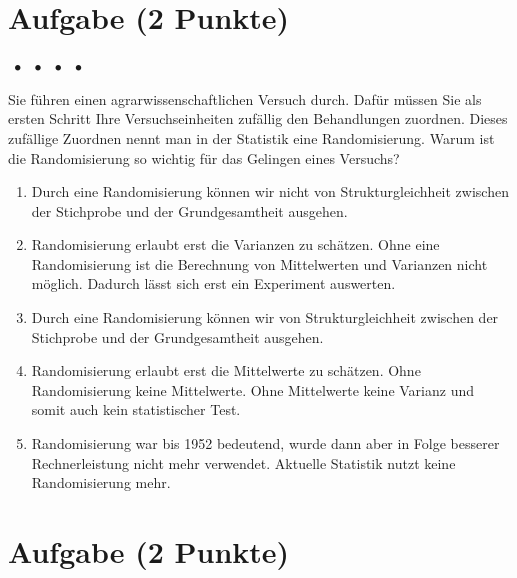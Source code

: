 \documentclass[a4paper, 9pt]{scrartcl}\usepackage[]{graphicx}\usepackage[]{xcolor}
\begin{document}
{\section{Aufgabe \hfill (2 Punkte)}

\ifcollection
\begin{flushright}
\tiny\vspace{-2Ex}
\textbf{\examinhaltstart}
\exammodulemathstat $\;\bullet$
\exammodulestat $\;\bullet$
\exammodulestatbbv $\;\bullet$
\exammodulestatversuch $\;\bullet$
\exammodulebiostat
\vspace{-1Ex}
\end{flushright}
\fi



Sie führen einen agrarwissenschaftlichen Versuch durch. Dafür müssen Sie als ersten Schritt Ihre Versuchseinheiten zufällig den Behandlungen zuordnen. Dieses zufällige Zuordnen nennt man in der Statistik eine Randomisierung. Warum ist die Randomisierung so wichtig für das Gelingen eines Versuchs?



\begin{enumerate}
\item [\textbf{A} \msquare] Durch eine Randomisierung können wir nicht von Strukturgleichheit zwischen der Stichprobe und der Grundgesamtheit ausgehen.
\item [\textbf{B} \msquare] Randomisierung erlaubt erst die Varianzen zu schätzen. Ohne eine Randomisierung ist die Berechnung von Mittelwerten und Varianzen nicht möglich. Dadurch lässt sich erst ein Experiment auswerten.
\item [\textbf{C} \msquare] Durch eine Randomisierung können wir von Strukturgleichheit zwischen der Stichprobe und der Grundgesamtheit ausgehen.
\item [\textbf{D} \msquare] Randomisierung erlaubt erst die Mittelwerte zu schätzen. Ohne Randomisierung keine Mittelwerte. Ohne Mittelwerte keine Varianz und somit auch kein statistischer Test.
\item [\textbf{E} \msquare] Randomisierung war bis 1952 bedeutend, wurde dann aber in Folge besserer Rechnerleistung nicht mehr verwendet. Aktuelle Statistik nutzt keine Randomisierung mehr.
\end{enumerate} 

\section{Aufgabe \hfill (2 Punkte)}

}
\end{document}
